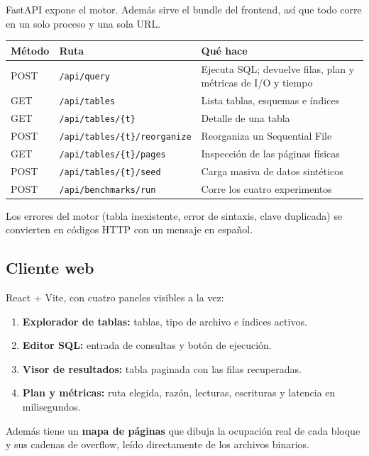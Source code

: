 \documentclass[11pt,a4paper]{article}
\newcommand{\code}[1]{\texttt{#1}}
\begin{document}
FastAPI expone el motor. Además sirve el bundle del frontend, así que todo corre en un
solo proceso y una sola URL.

\begin{center}
\begin{tabularx}{\textwidth}{l l Y}
\toprule
Método & Ruta & Qué hace \\
\midrule
POST & \code{/api/query} & Ejecuta SQL; devuelve filas, plan y métricas de I/O y tiempo \\
GET & \code{/api/tables} & Lista tablas, esquemas e índices \\
GET & \code{/api/tables/\{t\}} & Detalle de una tabla \\
POST & \code{/api/tables/\{t\}/reorganize} & Reorganiza un Sequential File \\
GET & \code{/api/tables/\{t\}/pages} & Inspección de las páginas físicas \\
POST & \code{/api/tables/\{t\}/seed} & Carga masiva de datos sintéticos \\
POST & \code{/api/benchmarks/run} & Corre los cuatro experimentos \\
\bottomrule
\end{tabularx}
\end{center}

Los errores del motor (tabla inexistente, error de sintaxis, clave duplicada) se
convierten en códigos HTTP con un mensaje en español.

\subsection{Cliente web}

React + Vite, con cuatro paneles visibles a la vez:

\begin{enumerate}
  \item \textbf{Explorador de tablas:} tablas, tipo de archivo e índices activos.
  \item \textbf{Editor SQL:} entrada de consultas y botón de ejecución.
  \item \textbf{Visor de resultados:} tabla paginada con las filas recuperadas.
  \item \textbf{Plan y métricas:} ruta elegida, razón, lecturas, escrituras y
        latencia en milisegundos.
\end{enumerate}

Además tiene un \textbf{mapa de páginas} que dibuja la ocupación real de cada bloque y
sus cadenas de overflow, leído directamente de los archivos binarios.
\end{document}
